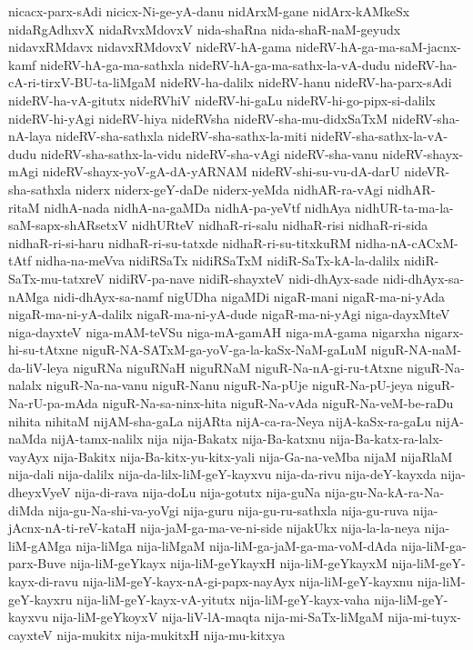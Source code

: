 {nicacx-parx-sAdi
nicicx-Ni-ge-yA-danu
nidArxM-gane
nidArx-kAMkeSx
nidaRgAdhxvX
nidaRvxMdovxV
nida-shaRna
nida-shaR-naM-geyudx
nidavxRMdavx
nidavxRMdovxV
nideRV-hA-gama
nideRV-hA-ga-ma-saM-jacnx-kamf
nideRV-hA-ga-ma-sathxla
nideRV-hA-ga-ma-sathx-la-vA-dudu
nideRV-ha-cA-ri-tirxV-BU-ta-liMgaM
nideRV-ha-dalilx
nideRV-hanu
nideRV-ha-parx-sAdi
nideRV-ha-vA-gitutx
nideRVhiV
nideRV-hi-gaLu
nideRV-hi-go-pipx-si-dalilx
nideRV-hi-yAgi
nideRV-hiya
nideRVsha
nideRV-sha-mu-didxSaTxM
nideRV-sha-nA-laya
nideRV-sha-sathxla
nideRV-sha-sathx-la-miti
nideRV-sha-sathx-la-vA-dudu
nideRV-sha-sathx-la-vidu
nideRV-sha-vAgi
nideRV-sha-vanu
nideRV-shayx-mAgi
nideRV-shayx-yoV-gA-dA-yARNAM
nideRV-shi-su-vu-dA-darU
nideVR-sha-sathxla
niderx
niderx-geY-daDe
niderx-yeMda
nidhAR-ra-vAgi
nidhAR-ritaM
nidhA-nada
nidhA-na-gaMDa
nidhA-pa-yeVtf
nidhAya
nidhUR-ta-ma-la-saM-sapx-shARsetxV
nidhURteV
nidhaR-ri-salu
nidhaR-risi
nidhaR-ri-sida
nidhaR-ri-si-haru
nidhaR-ri-su-tatxde
nidhaR-ri-su-titxkuRM
nidha-nA-cACxM-tAtf
nidha-na-meVva
nidiRSaTx
nidiRSaTxM
nidiR-SaTx-kA-la-dalilx
nidiR-SaTx-mu-tatxreV
nidiRV-pa-nave
nidiR-shayxteV
nidi-dhAyx-sade
nidi-dhAyx-sa-nAMga
nidi-dhAyx-sa-namf
nigUDha
nigaMDi
nigaR-mani
nigaR-ma-ni-yAda
nigaR-ma-ni-yA-dalilx
nigaR-ma-ni-yA-dude
nigaR-ma-ni-yAgi
niga-dayxMteV
niga-dayxteV
niga-mAM-teVSu
niga-mA-gamAH
niga-mA-gama
nigarxha
nigarx-hi-su-tAtxne
niguR-NA-SATxM-ga-yoV-ga-la-kaSx-NaM-gaLuM
niguR-NA-naM-da-liV-leya
niguRNa
niguRNaH
niguRNaM
niguR-Na-nA-gi-ru-tAtxne
niguR-Na-nalalx
niguR-Na-na-vanu
niguR-Nanu
niguR-Na-pUje
niguR-Na-pU-jeya
niguR-Na-rU-pa-mAda
niguR-Na-sa-ninx-hita
niguR-Na-vAda
niguR-Na-veM-be-raDu
nihita
nihitaM
nijAM-sha-gaLa
nijARta
nijA-ca-ra-Neya
nijA-kaSx-ra-gaLu
nijA-naMda
nijA-tamx-nalilx
nija
nija-Bakatx
nija-Ba-katxnu
nija-Ba-katx-ra-lalx-vayAyx
nija-Bakitx
nija-Ba-kitx-yu-kitx-yali
nija-Ga-na-veMba
nijaM
nijaRlaM
nija-dali
nija-dalilx
nija-da-lilx-liM-geY-kayxvu
nija-da-rivu
nija-deY-kayxda
nija-dheyxVyeV
nija-di-rava
nija-doLu
nija-gotutx
nija-guNa
nija-gu-Na-kA-ra-Na-diMda
nija-gu-Na-shi-va-yoVgi
nija-guru
nija-gu-ru-sathxla
nija-gu-ruva
nija-jAcnx-nA-ti-reV-kataH
nija-jaM-ga-ma-ve-ni-side
nijakUkx
nija-la-la-neya
nija-liM-gAMga
nija-liMga
nija-liMgaM
nija-liM-ga-jaM-ga-ma-voM-dAda
nija-liM-ga-parx-Buve
nija-liM-geYkayx
nija-liM-geYkayxH
nija-liM-geYkayxM
nija-liM-geY-kayx-di-ravu
nija-liM-geY-kayx-nA-gi-papx-nayAyx
nija-liM-geY-kayxnu
nija-liM-geY-kayxru
nija-liM-geY-kayx-vA-yitutx
nija-liM-geY-kayx-vaha
nija-liM-geY-kayxvu
nija-liM-geYkoyxV
nija-liV-lA-maqta
nija-mi-SaTx-liMgaM
nija-mi-tuyx-cayxteV
nija-mukitx
nija-mukitxH
nija-mu-kitxya
}
